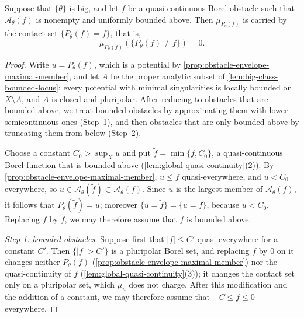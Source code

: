 \begin{theorem}\label{thm:quasicontinuous-obstacle-contact}
Suppose that $\{\theta\}$ is big, and let $f$ be a quasi-continuous Borel obstacle such that $\mathcal A_\theta(f)$ is nonempty and uniformly bounded above. Then $\mu_{P_\theta(f)}$ is carried by the contact set $\{P_\theta(f)=f\}$, that is,
\[
 \mu_{P_\theta(f)}(\{P_\theta(f)\ne f\})=0.
\]
\end{theorem}
\begin{proof}
Write $u=P_\theta(f)$, which is a potential by \cref{prop:obstacle-envelope-maximal-member}, and let $A$ be the proper analytic subset of \cref{lem:big-class-bounded-locus}: every potential with minimal singularities is locally bounded on $X\setminus A$, and $A$ is closed and pluripolar. After reducing to obstacles that are bounded above, we treat bounded obstacles by approximating them with lower semicontinuous ones (Step~1), and then obstacles that are only bounded above by truncating them from below (Step~2).

Choose a constant $C_0>\sup_Xu$ and put $\widetilde f=\min\{f,C_0\}$, a quasi-continuous Borel function that is bounded above (\cref{lem:global-quasi-continuity}(2)). By \cref{prop:obstacle-envelope-maximal-member}, $u\leq f$ quasi-everywhere, and $u<C_0$ everywhere, so $u\in\mathcal A_\theta(\widetilde f)\subset\mathcal A_\theta(f)$. Since $u$ is the largest member of $\mathcal A_\theta(f)$, it follows that $P_\theta(\widetilde f)=u$; moreover $\{u=\widetilde f\}=\{u=f\}$, because $u<C_0$. Replacing $f$ by $\widetilde f$, we may therefore assume that $f$ is bounded above.

\emph{Step 1: bounded obstacles.} Suppose first that $|f|\leq C'$ quasi-everywhere for a constant $C'$. Then $\{|f|>C'\}$ is a pluripolar Borel set, and replacing $f$ by $0$ on it changes neither $P_\theta(f)$ (\cref{prop:obstacle-envelope-maximal-member}) nor the quasi-continuity of $f$ (\cref{lem:global-quasi-continuity}(3)); it changes the contact set only on a pluripolar set, which $\mu_u$ does not charge. After this modification and the addition of a constant, we may therefore assume that $-C\leq f\leq0$ everywhere.


\end{proof}
